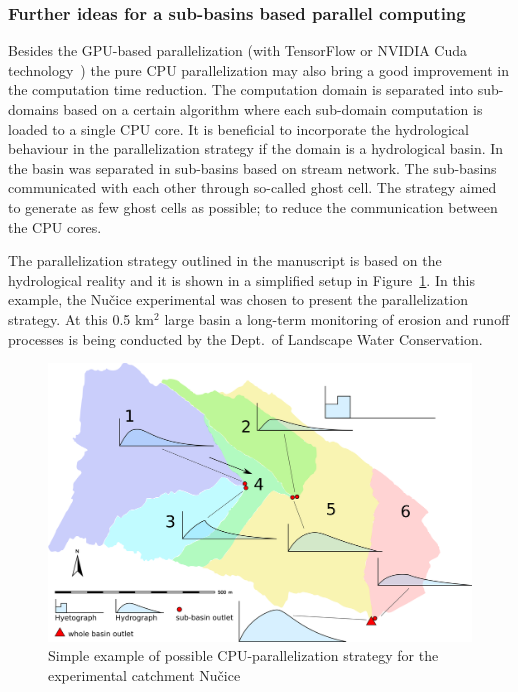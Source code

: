 \subsubsection{Further ideas for a sub-basins based parallel computing}
Besides the GPU-based parallelization (with TensorFlow \cite{tensorflow2015-whitepaper} or
NVIDIA Cuda technology~\cite{Kalyanapu2011,Le2015}) the
pure CPU parallelization may also bring a good improvement in the computation
time reduction. The computation domain is separated into sub-domains
based on a certain algorithm where each sub-domain computation is loaded to a single
CPU core.  It is beneficial to incorporate the
hydrological behaviour in the parallelization
strategy if the domain is a hydrological basin. 
In~\cite{Vivoni2011} the basin was separated in sub-basins
based on stream network. The sub-basins communicated with each other through so-called
ghost cell. The strategy aimed to generate as few ghost cells as
possible; to reduce the communication between the CPU cores. 

The parallelization strategy outlined in the manuscript is based on
the hydrological reality and it is shown in a simplified setup in Figure~\ref{fig:cpu-parallel}. In this example, the Nu\v{c}ice experimental 
was chosen to present the parallelization strategy. At this 0.5 km$^2$ large 
basin a long-term monitoring of erosion and runoff processes is being conducted 
by the Dept.\ of Landscape Water Conservation. 

\begin{figure}[ht!]
  \begin{center}
    \includegraphics[width=0.9\columnwidth]{figures/smoderp-cpu-parallel.png}
    \caption{Simple example of possible CPU-parallelization strategy for the experimental catchment Nu\v{c}ice}
    \label{fig:cpu-parallel}
  \end{center}
\end{figure}

